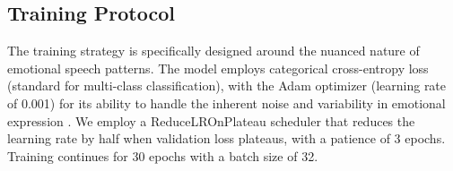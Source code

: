 \documentclass[../main.tex]{subfiles}
\begin{document}
\subsection{Training Protocol}
The training strategy is specifically designed around the nuanced nature of
emotional speech patterns. The model employs categorical cross-entropy loss
(standard for multi-class classification), with the Adam optimizer (learning rate of 0.001) for its
ability to handle the inherent noise and variability in emotional expression \citep{Bhatlawande2024}.
We employ a ReduceLROnPlateau scheduler that reduces the learning rate by half when validation 
loss plateaus, with a patience of 3 epochs. Training continues for 30 epochs with a batch size of 32.
\end{document}
